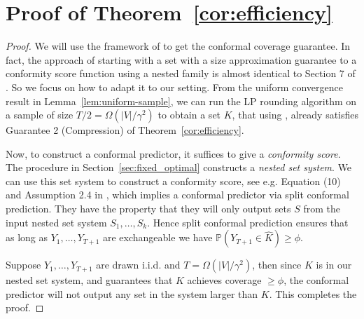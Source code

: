 \section{Proof of Theorem~\ref{cor:efficiency}}
\label{app:fixed}
\begin{proof} We will use the framework of \cite{gao2025volume} to get the conformal coverage guarantee. In fact, the approach of starting with a set with a size approximation guarantee to a conformity score function using a nested family is almost identical to Section 7 of \cite{gao2025highdimensional}. So we focus on how to adapt it to our setting.   From the uniform convergence result in Lemma~\ref{lem:uniform-sample}, we can run the LP rounding algorithm on a sample of size $T/2 = \Omega(|V| /\gamma^2)$ to obtain a set $K$, that using , already satisfies Guarantee 2 (Compression) of Theorem~\ref{cor:efficiency}.   

    Now, to construct a conformal predictor, it suffices to give a \emph{conformity score}. The procedure in Section~\ref{sec:fixed_optimal} constructs a  \emph{nested set system}. 
    We can use this set system to construct a conformity score, see e.g. Equation (10) and Assumption 2.4 in \cite{gao2025volume}, which implies a conformal predictor via split conformal prediction.  They have the property that they will only output sets \(S\) from the input nested set system $S_1, \dots, S_k$. Hence split conformal prediction ensures that as long as $Y_1, \dots, Y_{T+1}$ are exchangeable we have $\mathbb{P}(Y_{T+1} \in \hat{K}) \ge \phi$.

    Suppose \(Y_1, \dots, Y_{T + 1}\) are drawn i.i.d. and \(T =  \Omega(|V|/\gamma^2)\), then since \(K\) is in our nested set system, and  guarantees that \(K\) achieves coverage \(\ge \phi \), the conformal predictor will not output any set in the system larger than \(K\).  This completes the proof.
\end{proof}
